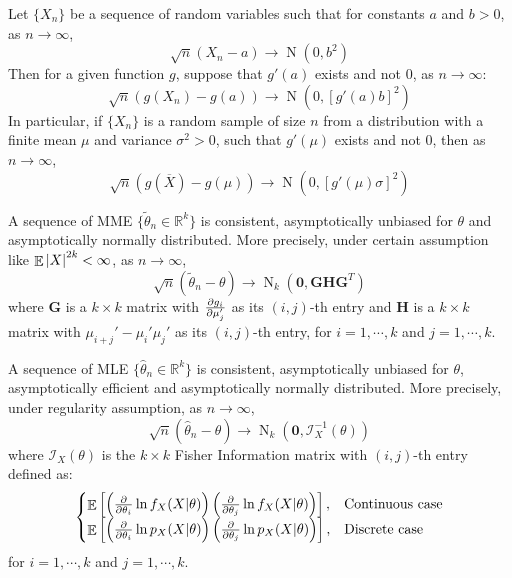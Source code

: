 \documentclass{huhtakm-template-book-v2}
\DeclareMathOperator{\E}{\mathbb{E}}
\DeclareMathOperator{\N}{N}
\begin{document}
\begin{thm}
	Let $\{X_{n}\}$ be a sequence of random variables such that for constants $a$ and $b>0$, as $n\to\infty$,
	\begin{equation*}
		\sqrt{n}(X_{n}-a)\to\N(0,b^{2})
	\end{equation*}
	Then for a given function $g$, suppose that $g'(a)$ exists and not $0$, as $n\to\infty$:
	\begin{equation*}
		\sqrt{n}(g(X_{n})-g(a))\to\N(0,[g'(a)b]^{2})
	\end{equation*}
	In particular, if $\{X_{n}\}$ is a random sample of size $n$ from a distribution with a finite mean $\mu$ and variance $\sigma^{2}>0$, such that $g'(\mu)$ exists and not $0$, then as $n\to\infty$,
	\begin{equation*}
		\sqrt{n}(g(\overline{X})-g(\mu))\to\N(0,[g'(\mu)\sigma]^{2})
	\end{equation*}
\end{thm}
\begin{thm}
	A sequence of MME $\{\tilde{\theta}_{n}\in\mathbb{R}^{k}\}$ is consistent, asymptotically unbiased for $\theta$ and asymptotically normally distributed. More precisely, under certain assumption like $\E\abs{X}^{2k}<\infty$, as $n\to\infty$,
	\begin{equation*}
		\sqrt{n}(\tilde{\theta}_{n}-\theta)\to\N_{k}(\mathbf{0},\mathbf{GHG}^{T})
	\end{equation*}
	where $\mathbf{G}$ is a $k\times k$ matrix with $\pdv{g_{i}}{\mu_{j}'}$ as its $(i,j)$-th entry and $\mathbf{H}$ is a $k\times k$ matrix with $\mu_{i+j}'-\mu_{i}'\mu_{j}'$ as its $(i,j)$-th entry, for $i=1,\cdots,k$ and $j=1,\cdots,k$.
\end{thm}
\begin{thm}
	A sequence of MLE $\{\hat{\theta}_{n}\in\mathbb{R}^{k}\}$ is consistent, asymptotically unbiased for $\theta$, asymptotically efficient and asymptotically normally distributed. More precisely, under regularity assumption, as $n\to\infty$,
	\begin{equation*}
		\sqrt{n}(\hat{\theta}_{n}-\theta)\to\N_{k}(\mathbf{0},\mathcal{I}_{X}^{-1}(\theta))
	\end{equation*}
	where $\mathcal{I}_{X}(\theta)$ is the $k\times k$ Fisher Information matrix with $(i,j)$-th entry defined as:
		\begin{equation*}
		\begin{cases}
			\E\left[\left(\pdv*{\ln{f_{X}(X|\theta)}}{\theta_{i}}\right)\left(\pdv*{\ln{f_{X}(X|\theta)}}{\theta_{j}}\right)\right], &\text{Continuous case}\\
			\E\left[\left(\pdv*{\ln{p_{X}(X|\theta)}}{\theta_{i}}\right)\left(\pdv*{\ln{p_{X}(X|\theta)}}{\theta_{j}}\right)\right], &\text{Discrete case}
		\end{cases}
	\end{equation*}
	for $i=1,\cdots,k$ and $j=1,\cdots,k$.
\end{thm}
\end{document}
